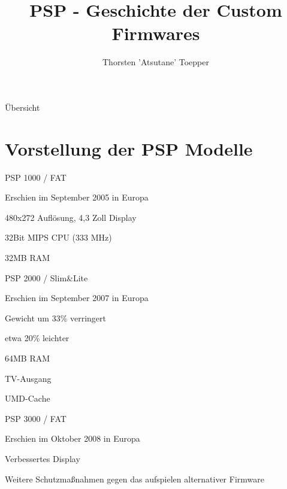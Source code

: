 \documentclass[mode=print,paper=screen,size=10pt,style=paintings]{powerdot}
\author{Thorsten 'Atsutane' Toepper}
\title{PSP - Geschichte der Custom Firmwares}
\newcommand{\Anf}[1]{\glqq #1\grqq}
\begin{document}
\maketitle
\begin{slide}{Übersicht}
  \tableofcontents[content=sections]
\end{slide}


\section{Vorstellung der PSP Modelle}
\begin{slide}{PSP 1000 / FAT}
	\begin{list}{-}{}
		\item{Erschien im September 2005 in Europa}
		\item{480x272 Auflösung, 4,3 Zoll Display}
		\item{32Bit MIPS CPU (333 MHz)}
		\item{32MB RAM}
	\end{list}
\end{slide}

\begin{slide}{PSP 2000 / Slim\&Lite}
	\begin{list}{-}{}
		\item{Erschien im September 2007 in Europa}
		\item{Gewicht um 33\% verringert}
		\item{etwa 20\% leichter}
		\item{64MB RAM}
		\item{TV-Ausgang}
		\item{UMD-Cache}
	\end{list}
\end{slide}

\begin{slide}{PSP 3000 / FAT}
	\begin{list}{-}{}
		\item{Erschien im Oktober 2008 in Europa}
		\item{\Anf{Verbessertes} Display}
		\item{Weitere Schutzmaßnahmen gegen das aufspielen alternativer Firmware}
	\end{list}
\end{slide}
\end{document}
